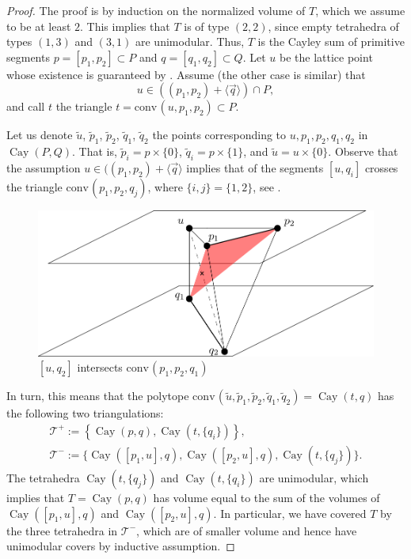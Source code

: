\documentclass{amsart}
\theoremstyle{plain}
\theoremstyle{definition}
\renewcommand{\vec}[1]{\overrightarrow#1}
\newcommand{\vecline}[1]{\langle \vec #1 \rangle}
\newcommand{\conv}{\ensuremath{\mathrm{conv}}\hspace{1pt}}
\newcommand{\cayley}{\operatorname{Cay}}
\begin{document}
\begin{proof}
The proof is by induction on the normalized volume of $T$, which we assume to be at least $2$. This implies that $T$ is of type $(2,2)$,
since empty tetrahedra of types $(1,3)$ and $(3,1)$ are unimodular. Thus, $T$ is the Cayley sum of primitive segments $p=[p_1,p_2]\subset P$ and $q=[q_1,q_2]\subset Q$.  
Let $u$ be the lattice point whose existence is guaranteed by . Assume  (the other case is similar) that 
\[
u \in ((p_1, p_2) + \vecline q ) \cap P,
\]
and call $t$ the triangle $t=\conv( u,  p_1,  p_2)\subset P$.

Let us denote $\tilde u$, $\tilde p_1$, $\tilde p_2$, $\tilde q_1$, $\tilde q_2$ the points corresponding to $u, p_1, p_2, q_1, q_2$ in $\cayley(P,Q)$.
That is, $\tilde p_i = p\times\{0\}$, $\tilde q_i = p\times\{1\}$, and $\tilde u = u\times\{0\}$.
Observe that the assumption $u\in((p_1, p_2) + \vecline q$ implies that of the segments $[u,q_i]$ crosses the triangle $\conv(p_1,p_2,q_j)$, where $\{i,j\}=\{1,2\}$, see . 

\begin{figure}[htb]
\includegraphics[scale=.3]{flip}
\caption{$[u,q_2]$ intersects $\conv(p_1,p_2,q_1)$}
\label{fig:flip}
\end{figure}

In turn, this means that the polytope $\conv(\tilde u, \tilde p_1, \tilde p_2, \tilde q_1, \tilde q_2) = \cayley(t,q)$
 has the following two triangulations:
\begin{gather*}
\mathcal T^+:= \left\{ \cayley(p,q), \cayley(t, \{q_i\}) \right\},
\\
\mathcal T^-:= \{ \cayley([p_1,u],q), \cayley([p_2,u],q), \cayley(t, \{q_j\}) \}.
\end{gather*}
The tetrahedra $\cayley(t, \{q_j\})$ and $\cayley(t, \{q_i\})$ are unimodular, which implies that $T=\cayley(p,q)$ has volume equal to the sum of the volumes of $\cayley([p_1,u],q)$ and $\cayley([p_2,u],q)$. In particular, we have covered $T$ by the three tetrahedra in $\mathcal T^-$, which are of smaller volume and hence have unimodular covers by inductive assumption.
\end{proof}
\end{document}
